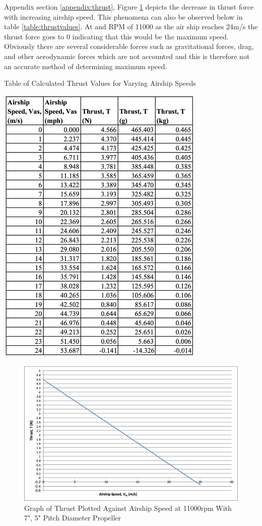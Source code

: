 \documentclass[../main.tex]{subfiles}
\begin{document}
Appendix section \ref{appendix:thrust}, Figure \ref{fig:thrusttablours} depicts the decrease in thrust force with increasing airship speed. This phenomena can also be observed below in table \ref{table:thrustvalues}. At and RPM of 11000 as the air ship reaches 24m/s the thrust force goes to 0 indicating that this would be the maximum speed. Obviously there are several considerable forces such as gravitational forces, drag, and other aerodynamic forces which are not accounted and this is therefore not an accurate method of determining maximum speed.
\begin{table}[H]
	\centering
    \caption{Table of Calculated Thrust Values for Varying Airship Speeds}
	\includegraphics[width=0.75\textwidth]{img/thrust/thrust_table.jpg}
	\label{table:thrustvalues}
\end{table}
\begin{figure}[H]
	\centering
	\includegraphics[width=1\textwidth]{img/thrust/thrustours.jpg}
	\caption{Graph of Thrust Plotted Against Airship Speed at 11000rpm With 7", 5" Pitch Diameter Propeller}
	\label{fig:thrusttablours}
\end{figure}
\end{document}
